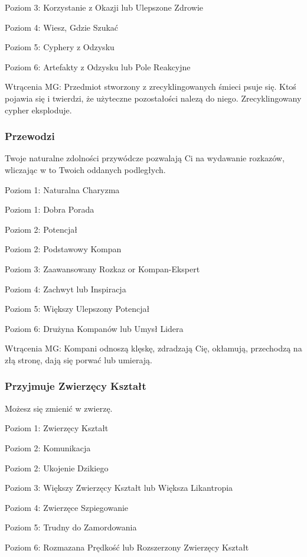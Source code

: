 Poziom 3: Korzystanie z Okazji lub Ulepszone Zdrowie

Poziom 4: Wiesz, Gdzie Szukać

Poziom 5: Cyphery z Odzysku

Poziom 6: Artefakty z Odzysku lub Pole Reakcyjne

Wtrącenia MG: Przedmiot stworzony z zrecyklingowanych śmieci psuje się. Ktoś pojawia się i twierdzi, że użyteczne pozostałości nalezą do niego. Zrecyklingowany cypher eksploduje. 

\subsubsection{Przewodzi}

Twoje naturalne zdolności przywódcze pozwalają Ci na wydawanie rozkazów, wliczając w to Twoich oddanych podległych.

Poziom 1: Naturalna Charyzma

Poziom 1: Dobra Porada

Poziom 2: Potencjał

Poziom 2:  Podstawowy Kompan

Poziom 3: Zaawansowany Rozkaz or Kompan-Ekspert

Poziom 4: Zachwyt lub Inspiracja

Poziom 5: Większy Ulepszony Potencjał

Poziom 6: Drużyna Kompanów lub Umysł Lidera

Wtrącenia MG: Kompani odnoszą klęskę, zdradzają Cię, okłamują, przechodzą na złą stronę, dają się porwać lub umierają.

\subsubsection{Przyjmuje Zwierzęcy Kształt}

Możesz się zmienić w zwierzę.

Poziom 1: Zwierzęcy Kształt

Poziom 2: Komunikacja

Poziom 2: Ukojenie Dzikiego

Poziom 3: Większy Zwierzęcy Kształt lub Większa Likantropia

Poziom 4: Zwierzęce Szpiegowanie

Poziom 5: Trudny do Zamordowania

Poziom 6: Rozmazana Prędkość lub  Rozszerzony Zwierzęcy Kształt

